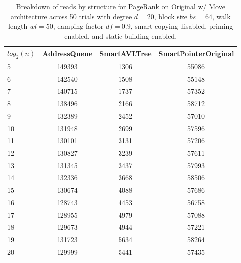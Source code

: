 \begin{table}[]
\centering
\begin{tabular}{|l|c|c|c|}
$log_2(n)$ & AddressQueue & SmartAVLTree & SmartPointerOriginal \\ \hline
5 & 149393 & 1306 & 55086 \\ \hline
6 & 142540 & 1508 & 55148 \\ \hline
7 & 140715 & 1737 & 57352 \\ \hline
8 & 138496 & 2166 & 58712 \\ \hline
9 & 132389 & 2452 & 57010 \\ \hline
10 & 131948 & 2699 & 57596 \\ \hline
11 & 130101 & 3131 & 57206 \\ \hline
12 & 130827 & 3239 & 57611 \\ \hline
13 & 131345 & 3437 & 57993 \\ \hline
14 & 132336 & 3668 & 58506 \\ \hline
15 & 130674 & 4088 & 57686 \\ \hline
16 & 128743 & 4453 & 56758 \\ \hline
17 & 128955 & 4979 & 57088 \\ \hline
18 & 129673 & 4944 & 57221 \\ \hline
19 & 131723 & 5634 & 58264 \\ \hline
20 & 129999 & 5441 & 57435 \\ \hline
\end{tabular}
\caption{Breakdown of reads by structure for PageRank on Original w/ Move architecture across 50 trials with degree $d=20$, block size $bs=64$, walk length $wl=50$, damping factor $df=0.9$, smart copying disabled, priming enabled, and static building enabled.}
    \label{tab:reads_by_structure_pr_d20_bs64_trials50_copiesfalse_primetrue_staticinsertiontrue_wl50_df0.9_ptoriginal_movetrue}
\end{table}

